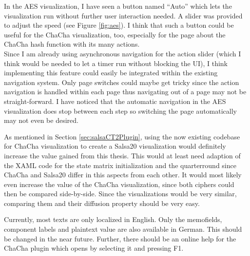 \begin{description}[style=nextline]
In the AES visualization, I have seen a button named ``Auto'' which lets the visualization run without further user interaction needed. A slider was provided to adjust the speed (see Figure \ref{fig:aes}). I think that such a button could be useful for the ChaCha visualization, too, especially for the page about the ChaCha hash function with its many actions. \\
Since I am already using asynchronous navigation for the action slider (which I think would be needed to let a timer run without blocking the UI), I think implementing this feature could easily be integrated within the existing navigation system. Only page switches could maybe get tricky since the action navigation is handled within each page thus navigating out of a page may not be straight-forward. I have noticed that the automatic navigation in the AES visualization does stop between each step so switching the page automatically may not even be desired.

\item[Salsa20 visualization]

As mentioned in Section \ref{sec:salsaCT2Plugin}, using the now existing codebase for ChaCha visualization to create a Salsa20 visualization would definitely increase the value gained from this thesis. This would at least need adaption of the XAML code for the state matrix initialization and the quarterround since ChaCha and Salsa20 differ in this aspects from each other. It would most likely even increase the value of the ChaCha visualization, since both ciphers could then be compared side-by-side. Since the visualizations would be very similar, comparing them and their diffusion property should be very easy.

\item[Localization and online help]

Currently, most texts are only localized in English. Only the memofields, component labels and plaintext value are also available in German. This should be changed in the near future. Further, there should be an online help for the ChaCha plugin which opens by selecting it and pressing F1.

\end{description}

